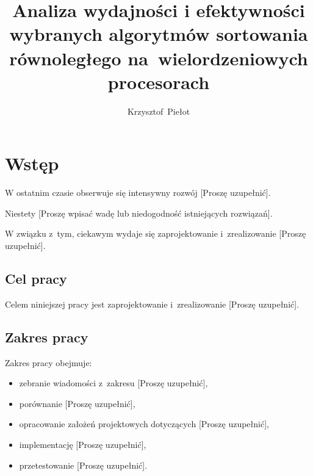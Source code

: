 \documentclass{PracaDyplomowa-Szablon}
\author{Krzysztof~Piełot}
\title{Analiza wydajności i efektywności wybranych algorytmów sortowania równoległego na~wielordzeniowych procesorach}
\begin{document}
\frontpage
\tableofcontents

\cleardoublepage %
\chapter*{Wstęp}


W ostatnim czasie obserwuje się intensywny rozwój [Proszę uzupełnić].

Niestety [Proszę wpisać wadę lub niedogodność istniejących rozwiązań].

W związku z~tym, ciekawym wydaje się zaprojektowanie i~zrealizowanie [Proszę uzupełnić].

\section*{Cel pracy}


Celem niniejszej pracy jest zaprojektowanie i~zrealizowanie [Proszę uzupełnić].

\section*{Zakres pracy}

Zakres pracy obejmuje:

\begin{itemize}
\item zebranie wiadomości z~zakresu [Proszę uzupełnić],

\item porównanie [Proszę uzupełnić],

\item opracowanie założeń projektowych dotyczących [Proszę uzupełnić],

\item implementację [Proszę uzupełnić],

\item przetestowanie [Proszę uzupełnić].
\end{itemize}
\end{document}
